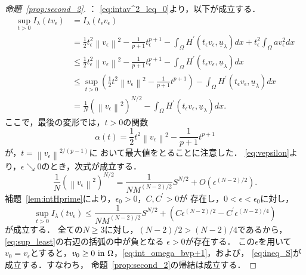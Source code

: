 \begin{proof}[命題~\ref{prop:second_2}]
 ：
 \eqref{eq:intav^2_leq_0}より，以下が成立する．
 \begin{align*}
  \sup_{t > 0} I_\lambda (t v_\epsilon) & = I_\lambda (t_\epsilon
  v_\epsilon) \\ 
  & = \frac{1}{2} t_\epsilon^2 \left\| v_\epsilon \right\|^2 -
  \frac{1}{p+1} t_\epsilon^{p+1} - \int_\Omega H^\prime(t_\epsilon
  v_\epsilon, \underline{u}_\lambda) dx + t_\epsilon^2
  \int_\Omega a v_\epsilon^2
  dx \\
  & \leq \frac{1}{2} t_\epsilon^2 \left\| v_\epsilon \right\|^2 -
  \frac{1}{p+1} t_\epsilon^{p+1} - \int_\Omega H^\prime(t_\epsilon
  v_\epsilon, \underline{u}_\lambda) dx \\
  & \leq \sup_{t > 0} \left( \frac{1}{2} t^2 \left\| v_\epsilon
  \right\|^2 - \frac{1}{p+1} t^{p+1} \right)
  - \int_\Omega H^\prime(t_\epsilon
  v_\epsilon, \underline{u}_\lambda) dx \\
  & = \frac{1}{N} \left( \left\| v_\epsilon \right\|^2 \right)^{N/2}
  - \int_\Omega H^\prime(t_\epsilon
  v_\epsilon, \underline{u}_\lambda) dx.
 \end{align*}
 ここで，最後の変形では，$t > 0$の関数
 \[
   \alpha(t) = \frac{1}{2} t^2 \left\| v_\epsilon \right\|^2 -
 \frac{1}{p+1} t^{p+1}
 \]
 が，$t = \left\| v_\epsilon \right\|^{2/(p-1)}$に
 おいて最大値をとることに注意した．
 \eqref{eq:vepsilon}より，$\epsilon \searrow 0$のとき，次式が成立する．
 \[
 \frac{1}{N} \left( \left\| v_\epsilon
 \right\|^2 \right)^{N/2} = \frac{1}{NM^{(N-2)/2}} S^{N/2}
 + O(\epsilon^{(N-2)/2}).
 \]
 補題~\ref{lem:intHprime}により，$\epsilon_0 > 0$，$C, C^\prime > 0$が
 存在し，$0 < \epsilon < \epsilon_0$に対し，
 \begin{equation}
  \sup_{t > 0} I_\lambda (tv_\epsilon) \leq \frac{1}{NM^{(N-2)/2}}
   S^{N/2} + \left( C \epsilon^{(N-2)/2} - C^\prime \epsilon^{(N-2)/4}
             \right) \label{eq:sup_least}
 \end{equation}
 が成立する．
 全ての$N \geq 3$に対し，$(N-2)/2 > (N-2)/4$であるから，
 \eqref{eq:sup_least}の右辺の括弧の中が負となる
 $\epsilon > 0$が存在する．
 この$\epsilon$を用いて$v_0 = v_\epsilon$とすると，$v_0 \geq 0 ~\text{in}~
 \Omega$，\eqref{eq:int_omega_bvp+1}，および，
 \eqref{eq:ineq_S}が成立する．すなわち，
 命題~\ref{prop:second_2}の帰結は成立する．
 

\end{proof}
